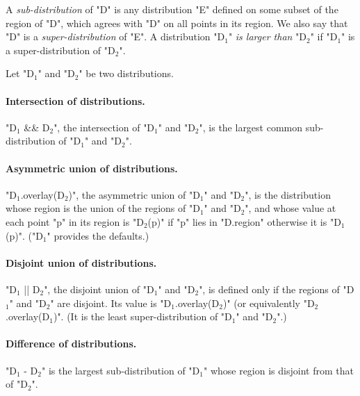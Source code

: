 A {\em sub-distribution} of \xcd"D" is
any distribution \xcd"E" defined on some subset of the region of
\xcd"D", which agrees with \xcd"D" on all points in its region.
We also say that \xcd"D" is a {\em super-distribution} of
\xcd"E". A distribution \xcdmath"D$_1$" {\em is larger than}
\xcdmath"D$_2$" if \xcdmath"D$_1$" is a super-distribution of
\xcdmath"D$_2$".

Let \xcdmath"D$_1$" and \xcdmath"D$_2$" be two distributions.  


\paragraph{Intersection of distributions.}
\xcdmath"D$_1$ && D$_2$", the intersection of \xcdmath"D$_1$"
and \xcdmath"D$_2$", is the largest common sub-distribution of
\xcdmath"D$_1$" and \xcdmath"D$_2$".

\paragraph{Asymmetric union of distributions.}
\xcdmath"D$_1$.overlay(D$_2$)", the asymmetric union of
\xcdmath"D$_1$" and \xcdmath"D$_2$", is the distribution whose
region is the union of the regions of \xcdmath"D$_1$" and
\xcdmath"D$_2$", and whose value at each point \xcd"p" in its
region is \xcdmath"D$_2$(p)" if \xcdmath"p" lies in
\xcdmath"D.region" otherwise it is \xcdmath"D$_1$(p)".
(\xcdmath"D$_1$" provides the defaults.)

\paragraph{Disjoint union of distributions.}
\xcdmath"D$_1$ || D$_2$", the disjoint union of \xcdmath"D$_1$"
and \xcdmath"D$_2$", is defined only if the regions of
\xcdmath"D$_1$" and \xcdmath"D$_2$" are disjoint. Its value is
\xcdmath"D$_1$.overlay(D$_2$)" (or equivalently
\xcdmath"D$_2$.overlay(D$_1$)".  (It is the least
super-distribution of \xcdmath"D$_1$" and \xcdmath"D$_2$".)

\paragraph{Difference of distributions.}
\xcdmath"D$_1$ - D$_2$" is the largest sub-distribution of
\xcdmath"D$_1$" whose region is disjoint from that of
\xcdmath"D$_2$".


